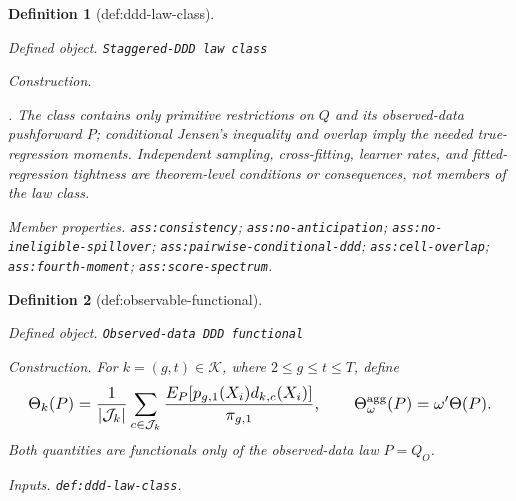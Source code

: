 \documentclass{article}
\newtheorem{definition}{Definition}
\begin{document}
\begin{definition}[def:ddd-law-class]\label{def:ddd-law-class}
\par\smallskip\noindent\emph{Defined object.} \texttt{Staggered-\allowbreak{}DDD law class}
\par\smallskip\noindent\emph{Construction.} \leavevmode\par\noindent {}\par\noindent. The class contains only primitive restrictions on \(Q\) and its observed-data pushforward \(P\); conditional Jensen's inequality and overlap imply the needed true-regression moments. Independent sampling, cross-fitting, learner rates, and fitted-regression tightness are theorem-level conditions or consequences, not members of the law class.
\par\smallskip\noindent\emph{Member properties.} \texttt{ass:\allowbreak{}consistency}; \texttt{ass:\allowbreak{}no-\allowbreak{}anticipation}; \texttt{ass:\allowbreak{}no-\allowbreak{}ineligible-\allowbreak{}spillover}; \texttt{ass:\allowbreak{}pairwise-\allowbreak{}conditional-\allowbreak{}ddd}; \texttt{ass:\allowbreak{}cell-\allowbreak{}overlap}; \texttt{ass:\allowbreak{}fourth-\allowbreak{}moment}; \texttt{ass:\allowbreak{}score-\allowbreak{}spectrum}.
\end{definition}

\begin{definition}[def:observable-functional]\label{def:observable-functional}
\par\smallskip\noindent\emph{Defined object.} \texttt{Observed-\allowbreak{}data DDD functional}
\par\smallskip\noindent\emph{Construction.} For \(k=(g,t)\in\mathcal K\), where \(2\le g\le t\le T\), define \[
\makebox[\linewidth][c]{\resizebox{0.98\linewidth}{!}{\leavevmode\par\noindent \makebox[\linewidth][c]{\resizebox{0.98\linewidth}{!}{\(\displaystyle \displaystyle \Theta_k(P)=\frac{1}{|\mathcal J_k|}\sum_{c\in\mathcal J_k}\frac{E_P[p_{g,1}(X_i)d_{k,c}(X_i)]}{\pi_{g,1}},\qquad \Theta_\omega^{\mathrm{agg}}(P)=\omega^{\prime}\Theta(P).\)}}\par\noindent}}
\] Both quantities are functionals only of the observed-data law \(P=Q_O\).
\par\smallskip\noindent\emph{Inputs.} \texttt{def:\allowbreak{}ddd-\allowbreak{}law-\allowbreak{}class}.
\end{definition}
\end{document}
